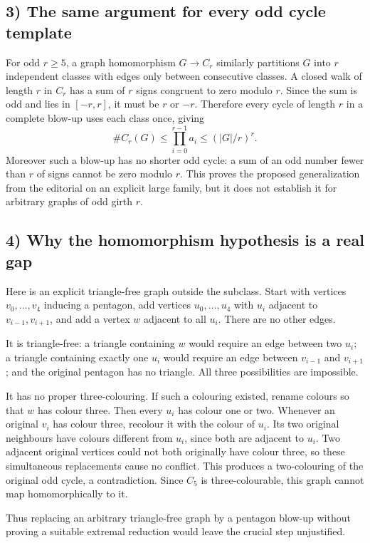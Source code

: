 \subsection*{3) The same argument for every odd cycle template}
For odd $r\ge5$, a graph homomorphism $G\to C_r$ similarly partitions $G$ into $r$ independent classes with edges only between consecutive classes. A closed walk of length $r$ in $C_r$ has a sum of $r$ signs congruent to zero modulo $r$. Since the sum is odd and lies in $[-r,r]$, it must be $r$ or $-r$. Therefore every cycle of length $r$ in a complete blow-up uses each class once, giving
\[
 \#C_r(G)\le\prod_{i=0}^{r-1}a_i\le(|G|/r)^r.
\]
Moreover such a blow-up has no shorter odd cycle: a sum of an odd number fewer than $r$ of signs cannot be zero modulo $r$. This proves the proposed generalization from the editorial on an explicit large family, but it does not establish it for arbitrary graphs of odd girth $r$.

\subsection*{4) Why the homomorphism hypothesis is a real gap}
Here is an explicit triangle-free graph outside the subclass. Start with vertices $v_0,\ldots,v_4$ inducing a pentagon, add vertices $u_0,\ldots,u_4$ with $u_i$ adjacent to $v_{i-1},v_{i+1}$, and add a vertex $w$ adjacent to all $u_i$. There are no other edges.

It is triangle-free: a triangle containing $w$ would require an edge between two $u_i$; a triangle containing exactly one $u_i$ would require an edge between $v_{i-1}$ and $v_{i+1}$; and the original pentagon has no triangle. All three possibilities are impossible.

It has no proper three-colouring. If such a colouring existed, rename colours so that $w$ has colour three. Then every $u_i$ has colour one or two. Whenever an original $v_i$ has colour three, recolour it with the colour of $u_i$. Its two original neighbours have colours different from $u_i$, since both are adjacent to $u_i$. Two adjacent original vertices could not both originally have colour three, so these simultaneous replacements cause no conflict. This produces a two-colouring of the original odd cycle, a contradiction. Since $C_5$ is three-colourable, this graph cannot map homomorphically to it.

Thus replacing an arbitrary triangle-free graph by a pentagon blow-up without proving a suitable extremal reduction would leave the crucial step unjustified.

